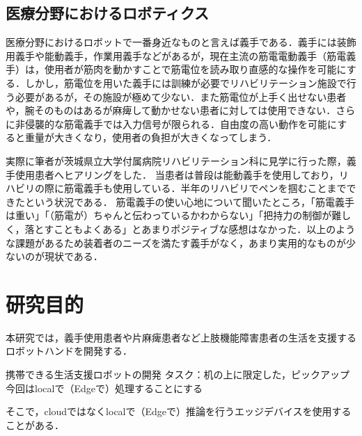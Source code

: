 \subsection{医療分野におけるロボティクス}
医療分野におけるロボットで一番身近なものと言えば義手である．義手には装飾用義手や能動義手，作業用義手などがあるが，現在主流の筋電電動義手（筋電義手）は，使用者が筋肉を動かすことで筋電位を読み取り直感的な操作を可能にする．しかし，筋電位を用いた義手には訓練が必要でリハビリテーション施設で行う必要があるが，その施設が極めて少ない\cite{リハビリテーション}．また筋電位が上手く出せない患者や，腕そのものはあるが麻痺して動かせない患者に対しては使用できない．さらに非侵襲的な筋電義手では入力信号が限られる．自由度の高い動作を可能にすると重量が大きくなり，使用者の負担が大きくなってしまう．

実際に筆者が茨城県立大学付属病院リハビリテーション科に見学に行った際，義手使用患者へヒアリングをした．
当患者は普段は能動義手を使用しており，リハビリの際に筋電義手も使用している．半年のリハビリでペンを掴むことまでできたという状況である．
筋電義手の使い心地について聞いたところ，「筋電義手は重い」「（筋電が）ちゃんと伝わっているかわからない」「把持力の制御が難しく，落とすこともよくある」とあまりポジティブな感想はなかった．以上のような課題があるため装着者のニーズを満たす義手がなく，あまり実用的なものが少ないのが現状である．


\begin{comment}
\section{関連研究}
ここではロボット開発の研究について紹介する．

TOYOTAはHuman Support Robot(HSR)を開発した\cite{HSR}．



机に置いて使うもの
Basic research of upper limb work support system “My Cybernic Robot Arm” for hemiplegic persons


強化学習で制御
教師ありで制御
\end{comment}


\section{研究目的}
本研究では，義手使用患者や片麻痺患者など上肢機能障害患者の生活を支援するロボットハンドを開発する．

携帯できる生活支援ロボットの開発
タスク：机の上に限定した，ピックアップ
今回はlocalで（Edgeで）処理することにする

そこで，cloudではなくlocalで（Edgeで）推論を行うエッジデバイスを使用することがある．
